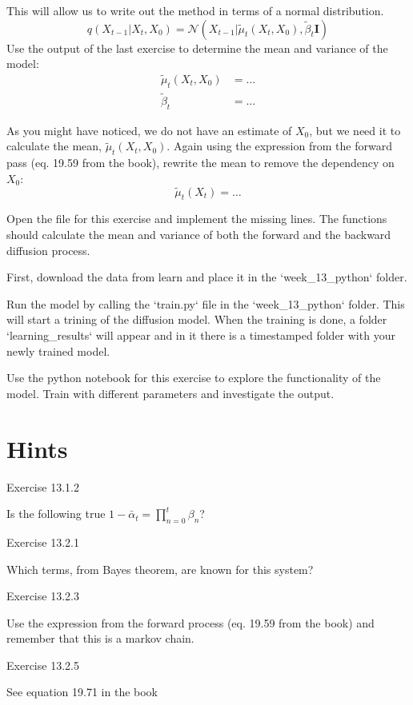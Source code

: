 \documentclass[12pt]{article}    %
\begin{document}
\exminor
This will allow us to write out the method in terms of a normal distribution. 
\begin{equation} \label{eq:forward-process-distribution}
    q(X_{t-1}|X_{t}, X_0) = \mathcal{N}(X_{t-1}| \tilde{\mu}_t(X_t, X_0), \tilde{\beta}_t \mathbf{I})
\end{equation}
Use the output of the last exercise to determine the mean and variance of the model:
\begin{align}
  \tilde{\mu}_t(X_t, X_0) &= \dots \\
  \tilde{\beta}_t &= \dots
\end{align}

\exminorhard
As you might have noticed, we do not have an estimate of $X_0$, but we need it to calculate the mean, $\tilde{\mu}_t(X_t, X_0)$.
Again using the expression from the forward pass (eq. 19.59 from the book), rewrite the mean to remove the dependency on $X_0$:
\begin{equation}
  \tilde{\mu}_t(X_t) = \dots
\end{equation}


\exminor 
Open the file for this exercise and implement the missing lines. 
The functions should calculate the mean and variance of both the forward and the backward diffusion process.

\exminor
First, download the data from learn and place it in the `week\_13\_python` folder.
 
Run the model by calling the `train.py` file in the `week\_13\_python` folder. This will start a trining of the diffusion model.
When the training is done, a folder `learning\_results` will appear and in it there is a timestamped folder with your newly trained model.

Use the python notebook for this exercise to explore the functionality of the model. Train with different parameters and investigate the output.

\section*{Hints}

Exercise 13.1.2

Is the following true $1-\bar{\alpha}_t = \prod_{n=0}^{t} \beta_n$?

Exercise 13.2.1

Which terms, from Bayes theorem, are known for this system?

Exercise 13.2.3

Use the expression from the forward process (eq. 19.59 from the book) and remember that this is a markov chain.

Exercise 13.2.5

See equation 19.71 in the book
\end{document}
